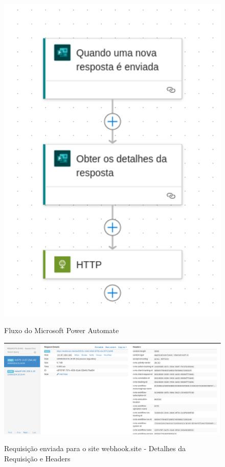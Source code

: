 \begin{figure}[H]
    \centering
    \caption{Fluxo do Microsoft Power Automate}
    \includegraphics[width=1\textwidth]{figuras/mpa_geral_vision.png}
    \label{fig:report_questions}
\end{figure}

\begin{figure}[H]
    \centering
    \caption{Requisição enviada para o site webhook.site - Detalhes da Requisição e Headers}
    \includegraphics[width=1\textwidth]{figuras/webhook_1.png}
    \label{fig:report_questions}
\end{figure}

